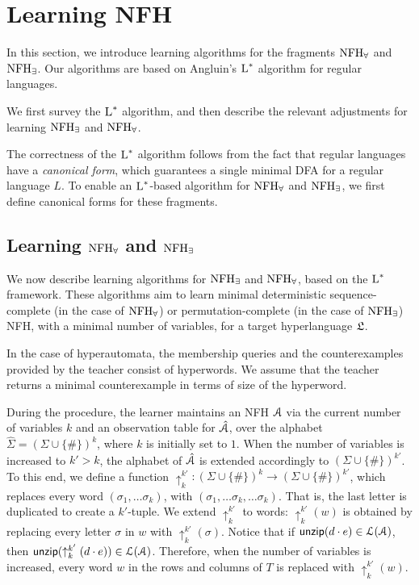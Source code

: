 \section{Learning NFH}

In this section, we introduce learning algorithms for the fragments $\textrm{NFH}_{\forall}$ and $\textrm{NFH}_{\exists}$. Our algorithms are based on Angluin's $\textsc{L}^*$ algorithm \cite{Angluin87} for regular languages.

We first survey the $\textsc{L}^*$ algorithm, and then describe the relevant adjustments for learning $\textrm{NFH}_{\exists}$ and $\textrm{NFH}_{\forall}$.



The correctness of the $\textsc{L}^*$ algorithm follows from the fact that regular languages have a {\em canonical form}, which guarantees a single minimal DFA for a regular language $L$. To enable an $\textsc{L}^*$-based algorithm for  $\textrm{NFH}_{\forall}$ and $\textrm{NFH}_{\exists}$, we first define canonical forms for these fragments. 




\subsection{Learning $\textrm{NFH}_{\forall}$ and $\textrm{NFH}_{\exists}$}

We now describe learning algorithms for $\textrm{NFH}_{\exists}$ and $\textrm{NFH}_{\forall}$, based on the $\textsc{L}^*$ framework.
These algorithms aim to learn minimal deterministic sequence-complete (in the case of $\textrm{NFH}_{\forall}$) or permutation-complete (in the case of $\textrm{NFH}_{\exists}$) NFH, with a minimal number of variables, for a target hyperlanguage $\mathfrak{L}$.

In the case of hyperautomata, the membership queries and the counterexamples provided by the teacher consist of hyperwords. We assume that the teacher returns a minimal counterexample in terms of size of the hyperword. 

During the procedure, the learner maintains an NFH $\mathcal{A}$ via the current number of variables $k$ and an observation table for $\hat{\mathcal{A}}$, over the alphabet $\hat\Sigma  = (\Sigma\cup\{\#\})^k$, where $k$ is initially set to $1$. 
When the number of variables is increased to $k'>k$, the alphabet of $\hat{\mathcal{A}}$ is extended accordingly to $(\Sigma\cup\{\#\})^{k'}$. 
To this end, we define a function $\uparrow_k^{k'}:(\Sigma\cup\{\#\})^k\rightarrow (\Sigma\cup\{\#\})^{k'}$, which replaces every word $(\sigma_1,\ldots \sigma_k)$, with $(\sigma_1,\ldots \sigma_k,\ldots \sigma_k)$. That is, the last letter is duplicated to create a $k'$-tuple. 
We extend $\uparrow_k^{k'}$ to words: $\uparrow_k^{k'}(w)$ is obtained by replacing every letter $\sigma$ in $w$ with $\uparrow_k^{k'}(\sigma)$. 
Notice that if $\mathsf{unzip}(d\cdot e) \in \mathcal{L}(\mathcal{A})$, then $\mathsf{unzip}(\uparrow_k^{k'}(d\cdot e)) \in \mathcal{L}(\mathcal{A})$. 
Therefore, when the number of variables is increased, every word $w$ in the rows and columns of $T$ is replaced with $\uparrow_k^{k'}(w)$. 


